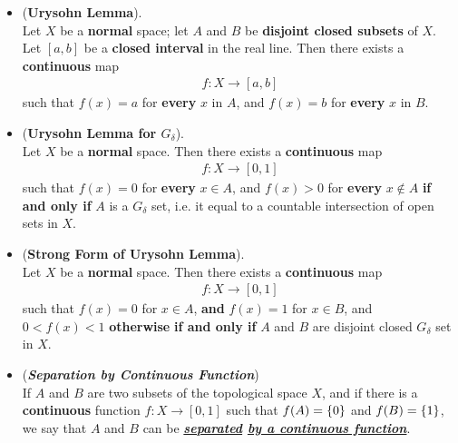 \documentclass[11pt]{article}
\begin{document}
\begin{itemize}
\item \begin{theorem} (\textbf{Urysohn Lemma}). \citep{munkres2000topology}\\
Let $X$ be a \textbf{normal} space; let $A$ and $B$ be \textbf{disjoint closed subsets} of $X$. Let $[a, b]$ be a \textbf{closed interval} in the real line. Then there exists a \textbf{continuous} map
\begin{align*}
f : X \rightarrow [a, b]
\end{align*}
such that $f(x) = a$ for \textbf{every} $x$ in $A$, and $f(x) = b$ for \textbf{every} $x$ in $B$.
\end{theorem}

\item \begin{corollary} (\textbf{Urysohn Lemma for $G_{\delta}$}). \citep{munkres2000topology}\\
Let $X$ be a \textbf{normal} space. Then there exists a \textbf{continuous} map
\begin{align*}
f : X \rightarrow [0, 1]
\end{align*}
such that $f(x) = 0$ for \textbf{every} $x \in A$, and $f(x) > 0$ for \textbf{every} $x \not\in A$ \textbf{if and only if} $A$ is a $G_{\delta}$ set, i.e. it equal to a countable intersection of open sets in $X$.
\end{corollary}

\item \begin{theorem} (\textbf{Strong Form of Urysohn Lemma}). \citep{munkres2000topology}\\
Let $X$ be a \textbf{normal} space. Then there exists a \textbf{continuous} map
\begin{align*}
f : X \rightarrow [0, 1]
\end{align*}
such that $f(x) = 0$ for $x \in A$, \textbf{and} $f(x) = 1$ for $x \in B$, and $0 < f(x) < 1$ \textbf{otherwise}  \textbf{if and only if} $A$ and $B$ are disjoint closed $G_{\delta}$ set  in $X$.
\end{theorem}

\item \begin{definition} (\emph{\textbf{Separation by Continuous Function}})\\
If $A$ and $B$ are two subsets of the topological space $X$, and if there is a \textbf{continuous} function $f : X \rightarrow [0, 1]$ such that $f(A) = \left\{0\right\}$ and $f(B) = \left\{1\right\}$, we say that $A$ and $B$ can be \emph{\textbf{\underline{separated} \underline{by a continuous function}}}.
\end{definition}


\end{itemize}
\end{document}
